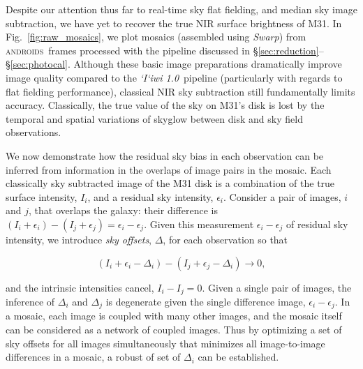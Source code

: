 \documentclass[iop]{emulateapj}
\newcommand{\sw}[1]{\textit{#1}} %
\newcommand{\iiwione}{\sw{`I`iwi 1.0}}
\newcommand{\androids}{\textsc{androids}}
\newcommand{\Fig}[1]{Fig.~\ref{fig:#1}}  %
\newcommand{\Sec}[1]{\S\ref{sec:#1}}  %
\begin{document}
Despite our attention thus far to real-time sky flat fielding, and median sky image subtraction, we have yet to recover the true NIR surface brightness of M31.
In \Fig{raw_mosaics}, we plot mosaics (assembled using \sw{Swarp}) from \androids\ frames processed with the pipeline discussed in \Sec{reduction}--\Sec{photocal}.
Although these basic image preparations dramatically improve image quality compared to the \iiwione\ pipeline (particularly with regards to flat fielding performance), classical NIR sky subtraction still fundamentally limits accuracy.
Classically, the true value of the sky on M31's disk is lost by the temporal and spatial variations of skyglow between disk and sky field observations.

We now demonstrate how the residual sky bias in each observation can be inferred from information in the overlaps of image pairs in the mosaic.
Each classically sky subtracted image of the M31 disk is a combination of the true surface intensity, $I_i$, and a residual sky intensity, $\epsilon_i$.
Consider a pair of images, $i$ and $j$, that overlaps the galaxy: their difference is $(I_i+\epsilon_i) - (I_j+\epsilon_j) = \epsilon_i - \epsilon_j$.
Given this measurement $\epsilon_i - \epsilon_j$ of residual sky intensity, we introduce \emph{sky offsets}, $\Delta$, for each observation so that

\begin{equation}
    (I_i + \epsilon_i - \Delta_i) - (I_j + \epsilon_j - \Delta_i) \rightarrow 0,
\end{equation}

\noindent and the intrinsic intensities cancel, $I_i - I_j = 0$.
Given a single pair of images, the inference of $\Delta_i$ and $\Delta_j$ is degenerate given the single difference image, $\epsilon_i-\epsilon_j$.
In a mosaic, each image is coupled with many other images, and the mosaic itself can be considered as a network of coupled images.
Thus by optimizing a set of sky offsets for all images simultaneously that minimizes all image-to-image differences in a mosaic, a robust of set of $\Delta_i$ can be established.



\end{document}
